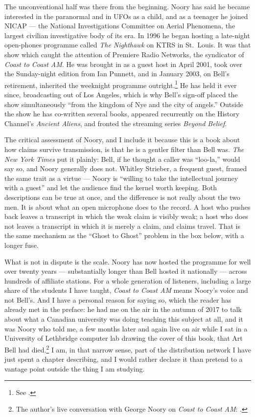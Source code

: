The unconventional half was there from the beginning. Noory has said he became interested in the
paranormal and in UFOs as a child, and as a teenager he joined NICAP --- the National Investigations
Committee on Aerial Phenomena, the largest civilian investigative body of its era. In 1996 he
began hosting a late-night open-phones programme called \emph{The Nighthawk} on KTRS in St.\ Louis. It
was that show which caught the attention of Premiere Radio Networks, the syndicator of \emph{Coast to
Coast AM}. He was brought in as a guest host in April 2001, took over the Sunday-night edition from
Ian Punnett, and in January 2003, on Bell's retirement, inherited the weeknight programme
outright.\footnote{See .} He has held it ever since,
broadcasting out of Los Angeles, which is why Bell's sign-off placed the show simultaneously ``from the
kingdom of Nye and the city of angels.'' Outside the show he has co-written several books, appeared
recurrently on the History Channel's \emph{Ancient Aliens}, and fronted the streaming series
\emph{Beyond Belief}.

The critical assessment of Noory, and I include it because this is a book about how claims survive
transmission, is that he is a gentler filter than Bell was. \emph{The New York Times} put it plainly:
Bell, if he thought a caller was ``loo-la,'' would say so, and Noory generally does not. Whitley
Strieber, a frequent guest, framed the same trait as a virtue --- Noory is ``willing to take the
intellectual journey with a guest'' and let the audience find the kernel worth keeping. Both
descriptions can be true at once, and the difference is not really about the two men. It is about what
an open microphone does to the record. A host who pushes back leaves a transcript in which the weak
claim is visibly weak; a host who does not leaves a transcript in which it is merely a claim, and
claims travel. That is the same mechanism as the ``Ghost to Ghost'' problem in the box below, with a
longer fuse.

What is not in dispute is the scale. Noory has now hosted the programme for well over twenty years ---
substantially longer than Bell hosted it nationally --- across hundreds of affiliate stations. For a
whole generation of listeners, including a large share of the students I have taught, \emph{Coast to
Coast AM} means Noory's voice and not Bell's. And I have a personal reason for saying so, which the
reader has already met in the preface: he had me on the air in the autumn of 2017 to talk about what a
Canadian university was doing teaching this subject at all, and it was Noory who told me, a few months
later and again live on air while I sat in a University of Lethbridge computer lab drawing the cover of
this book, that Art Bell had died.\footnote{The author's live conversation with George Noory on \emph{Coast to Coast AM}:
.}
I am, in that narrow sense, part of the distribution network I have just spent a chapter describing,
and I would rather declare it than pretend to a vantage point outside the thing I am studying.

